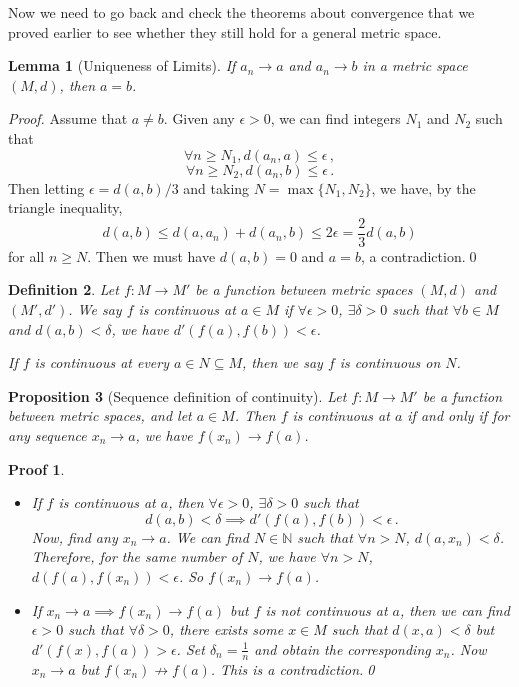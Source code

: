 \documentclass{article}
\theoremstyle{plain}\theoremheaderfont{\normalfont\itshape}\theorembodyfont{\rmfamily}\theoremseparator{.}\newtheorem*{rem}{Remark}\newtheorem*{ex}{Example}\newtheorem*{proof}{Proof}\newtheorem*{altp}{Alternative proof}
\theoremstyle{plain}\theoremheaderfont{\normalfont\bfseries}\theorembodyfont{\rmfamily}\theoremseparator{.}\newtheorem{thm}{Theorem}[section]\newtheorem{lem}[thm]{Lemma}\newtheorem{prop}[thm]{Proposition}\newtheorem*{cor}{Corollary}\newtheorem{defn}[thm]{Definition}\newtheorem{clm}[thm]{Claim}\newtheorem{clminproof}{Claim}
\theoremstyle{break}\theoremheaderfont{\normalfont\itshape}\theorembodyfont{\rmfamily}\theoremseparator{.\medskip}\newtheorem*{proofskip}{Proof}\newtheorem*{exs}{Examples}\newtheorem*{rems}{Remarks}
\theoremstyle{break}\theoremheaderfont{\normalfont\bfseries}\theorembodyfont{\rmfamily}\theoremseparator{.\medskip}\newtheorem{lemskip}[thm]{Lemma}\newtheorem{defnskip}[thm]{Definition}\newtheorem{propskip}[thm]{Proposition}\newtheorem{thmskip}[thm]{Theorem}
\newcommand{\qed}{\hfill\ensuremath{\Box}}
\begin{document}
    Now we need to go back and check the theorems about convergence that we proved earlier to see whether they still hold for a general metric space.
    \begin{lem}[Uniqueness of Limits]
        If \(a_n\to a\) and \(a_n\to b\) in a metric space \((M,d)\), then \(a=b\).
    \end{lem}
    \begin{proof}
        Assume that \(a\ne b\). Given any \(\epsilon>0\), we can find integers \(N_1\) and \(N_2\) such that
        \[\forall n\ge N_1, d(a_n,a)\le\epsilon\,,\]
        \[\forall n\ge N_2, d(a_n,b)\le\epsilon\,.\]
        Then letting \(\epsilon=d(a,b)/3\) and taking \(N=\max\{N_1,N_2\}\), we have, by the triangle inequality,
        \[d(a,b)\le d(a,a_n)+d(a_n,b)\le 2\epsilon=\frac{2}{3}d(a,b)\]
        for all \(n\ge N\). Then we must have \(d(a,b)=0\) and \(a=b\), a contradiction.\qed
    \end{proof}

    \begin{defn}
        Let \(f:M\to M'\) be a function between metric spaces \((M,d)\) and \((M',d')\). We say \(f\) is \textit{continuous} at \(a\in M\) if \(\forall\epsilon>0\), \(\exists\delta>0\) such that \(\forall b\in M\) and \(d(a,b)<\delta\), we have \(d'(f(a),f(b))<\epsilon\).

        If \(f\) is continuous at every \(a\in N\subseteq M\), then we say \(f\) is \textit{continuous} on \(N\).
    \end{defn}

    \begin{prop}[Sequence definition of continuity]
        Let \(f:M\to M'\) be a function between metric spaces, and let \(a\in M\). Then \(f\) is continuous at \(a\) if and only if for any sequence \(x_n\to a\), we have \(f(x_n)\to f(a)\).
    \end{prop}
    \begin{proofskip}
        \begin{itemize}[topsep=0pt]
            \item[(\(\Rightarrow\))] If \(f\) is continuous at \(a\), then \(\forall\epsilon>0\), \(\exists\delta>0\) such that
            \[d(a,b)<\delta\implies d'(f(a),f(b))<\epsilon\,.\]
            Now, find any \(x_n\to a\). We can find \(N\in\mathbb{N}\) such that \(\forall n>N\), \(d(a,x_n)<\delta\). Therefore, for the same number of \(N\), we have \(\forall n>N\), \(d(f(a),f(x_n))<\epsilon\). So \(f(x_n)\to f(a)\).
            \item[(\(\Leftarrow\))] If \(x_n\to a\implies f(x_n)\to f(a)\) but \(f\) is not continuous at \(a\), then we can find \(\epsilon>0\) such that \(\forall\delta>0\), there exists some \(x\in M\) such that \(d(x,a)<\delta\) but \(d'(f(x),f(a))>\epsilon\). Set \(\delta_n=\frac{1}{n}\) and obtain the corresponding \(x_n\). Now \(x_n\to a\) but \(f(x_n)\not\to f(a)\). This is a contradiction.\qed
        \end{itemize}
    \end{proofskip}
\end{document}
